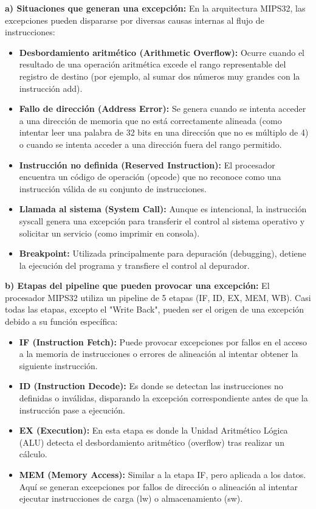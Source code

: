 \documentclass[12pt,a4paper]{article}
\begin{document}
\textbf{a) Situaciones que generan una excepción:} En la arquitectura MIPS32, las excepciones pueden dispararse por diversas causas internas al flujo de instrucciones:
\begin{itemize}
    \item \textbf{Desbordamiento aritmético (Arithmetic Overflow):} Ocurre cuando el resultado de una operación aritmética excede el rango representable del registro de destino (por ejemplo, al sumar dos números muy grandes con la instrucción add).
    \item \textbf{Fallo de dirección (Address Error):} Se genera cuando se intenta acceder a una dirección de memoria que no está correctamente alineada (como intentar leer una palabra de 32 bits en una dirección que no es múltiplo de 4) o cuando se intenta acceder a una dirección fuera del rango permitido.
    \item \textbf{Instrucción no definida (Reserved Instruction):} El procesador encuentra un código de operación (opcode) que no reconoce como una instrucción válida de su conjunto de instrucciones.
    \item \textbf{Llamada al sistema (System Call):} Aunque es intencional, la instrucción syscall genera una excepción para transferir el control al sistema operativo y solicitar un servicio (como imprimir en consola).
    \item \textbf{Breakpoint:} Utilizada principalmente para depuración (debugging), detiene la ejecución del programa y transfiere el control al depurador.
\end{itemize}

\textbf{b) Etapas del pipeline que pueden provocar una excepción:} El procesador MIPS32 utiliza un pipeline de 5 etapas (IF, ID, EX, MEM, WB). Casi todas las etapas, excepto el "Write Back", pueden ser el origen de una excepción debido a su función específica:
\begin{itemize}
    \item \textbf{IF (Instruction Fetch):} Puede provocar excepciones por fallos en el acceso a la memoria de instrucciones o errores de alineación al intentar obtener la siguiente instrucción.
    \item \textbf{ID (Instruction Decode):} Es donde se detectan las instrucciones no definidas o inválidas, disparando la excepción correspondiente antes de que la instrucción pase a ejecución.
    \item \textbf{EX (Execution):} En esta etapa es donde la Unidad Aritmético Lógica (ALU) detecta el desbordamiento aritmético (overflow) tras realizar un cálculo.
    \item \textbf{MEM (Memory Access):} Similar a la etapa IF, pero aplicada a los datos. Aquí se generan excepciones por fallos de dirección o alineación al intentar ejecutar instrucciones de carga (lw) o almacenamiento (sw).
\end{itemize}
\end{document}
